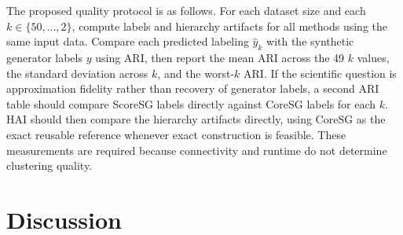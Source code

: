 \documentclass[11pt]{article}
\begin{document}
\begin{table}[t]
\centering
\caption{Planned ARI and HAI evaluation layout. Values are intentionally marked as unavailable because quality experiments have not yet been run. HAI definition and implementation are [INFORMAÇÃO NECESSÁRIA].}
\label{tab:quality-layout}
\end{table}

The proposed quality protocol is as follows. For each dataset size and each \(k \in \{50,\ldots,2\}\), compute labels and hierarchy artifacts for all methods using the same input data. Compare each predicted labeling \(\hat{y}_k\) with the synthetic generator labels \(y\) using ARI, then report the mean ARI across the 49 \(k\) values, the standard deviation across \(k\), and the worst-\(k\) ARI. If the scientific question is approximation fidelity rather than recovery of generator labels, a second ARI table should compare ScoreSG labels directly against CoreSG labels for each \(k\). HAI should then compare the hierarchy artifacts directly, using CoreSG as the exact reusable reference whenever exact construction is feasible. These measurements are required because connectivity and runtime do not determine clustering quality.

\section{Discussion}
\end{document}
